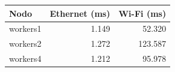 \begin{center}
\small
\begin{tabular}{lrr}
\toprule
Nodo & Ethernet (ms) & Wi-Fi (ms) \\
\midrule
workers1 & 1.149 & 52.320 \\
workers2 & 1.272 & 123.587 \\
workers4 & 1.212 & 95.978 \\
\bottomrule
\end{tabular}
\end{center}
